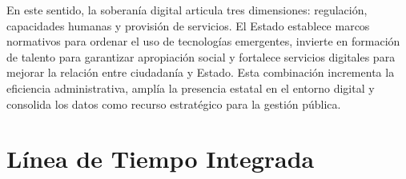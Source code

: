\documentclass[9pt,letterpaper,twocolumn,twoside,apabib]{rho-class/rho}
\begin{document}
En este sentido, la soberanía digital articula tres dimensiones: regulación, capacidades humanas y provisión de servicios. El Estado establece marcos normativos para ordenar el uso de tecnologías emergentes, invierte en formación de talento para garantizar apropiación social y fortalece servicios digitales para mejorar la relación entre ciudadanía y Estado. Esta combinación incrementa la eficiencia administrativa, amplía la presencia estatal en el entorno digital y consolida los datos como recurso estratégico para la gestión pública.

% 

\section{Línea de Tiempo Integrada}
\end{document}
